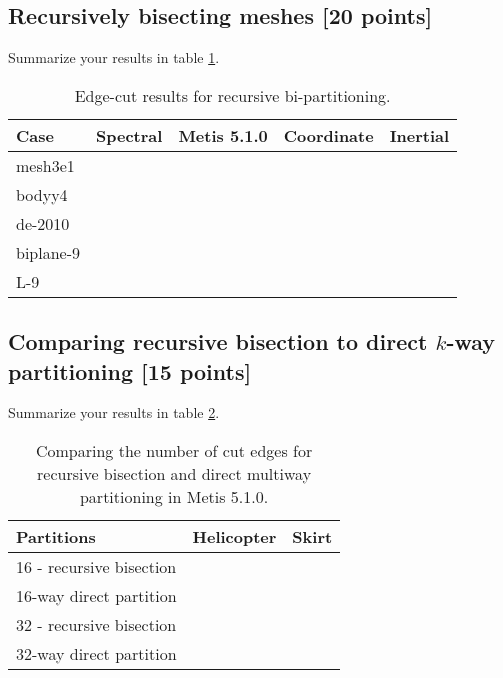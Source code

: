 \documentclass[unicode,11pt,a4paper,oneside,numbers=endperiod,openany]{scrartcl}
\begin{document}
\subsection{Recursively bisecting meshes [20 points]}

Summarize your results in table \ref{table:Rec_bisection}.

\begin{table}[h]
\caption{Edge-cut results for recursive bi-partitioning.}
\centering
\begin{tabular}{l|r|r|r|r} \hline\hline 
 Case            &  Spectral             &  Metis 5.1.0    & Coordinate & Inertial  \\ \hline
 mesh3e1         &                       &                 &            &           \\             
 bodyy4        &                       &                 &            &           \\ 
 de-2010            &                       &                 &            &           \\ 
 biplane-9          &                       &                 &            &           \\ 
 L-9           &                       &                 &            &           \\  \hline \hline
\end{tabular}
\label{table:Rec_bisection}
\end{table}


\subsection{Comparing recursive bisection to direct $k$-way partitioning [15 points]}

Summarize your results in table \ref{table:Compare_Metis}.

\begin{table}[h]
\caption{Comparing the number of cut edges for recursive bisection and direct multiway partitioning in Metis 5.1.0.}
\centering
\begin{tabular}{l|r|r} \hline\hline 
Partitions       &   Helicopter           & Skirt  \\ \hline
 16 - recursive bisection             &                       &     \\   
 16-way direct partition             &                       &             \\           
 32 - recursive bisection                &                       &             \\
 32-way direct partition              &                       &             \\  \hline \hline
\end{tabular}              
\label{table:Compare_Metis}
\end{table}
\end{document}
